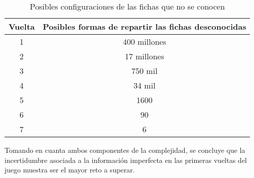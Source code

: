 \begin{table}[H]
    \centering
    \caption{Posibles configuraciones de las fichas que no se conocen}
    \label{PC}
    \begin{tabular}{|c|c|}
        \hline
        Vuelta & Posibles formas de repartir las fichas desconocidas \\
        \hline
        1      & 400 millones                                        \\
        2      & 17 millones                                         \\
        3      & 750 mil                                             \\
        4      & 34 mil                                              \\
        5      & 1600                                                \\
        6      & 90                                                  \\
        7      & 6                                                   \\
        \hline
    \end{tabular}


\end{table}

Tomando en cuanta ambos componentes de la complejidad, se concluye que la
incertidumbre asociada a la información imperfecta en las primeras vueltas del
juego muestra ser el mayor reto a superar.



